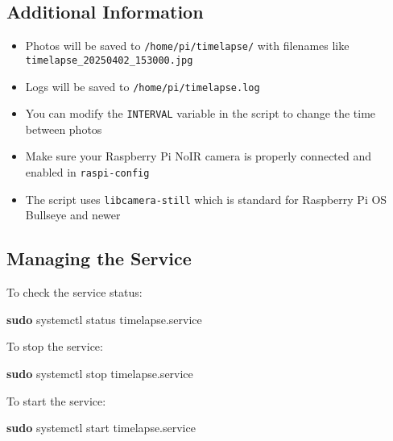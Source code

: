 \documentclass[
]{article}
\newenvironment{Shaded}{\begin{snugshade}}{\end{snugshade}}
\newcommand{\FunctionTok}[1]{\textcolor[rgb]{0.13,0.29,0.53}{\textbf{#1}}}
\newcommand{\NormalTok}[1]{#1}
\providecommand{\tightlist}{%
  \setlength{\itemsep}{0pt}\setlength{\parskip}{0pt}}
\begin{document}
\subsection{Additional Information}\label{additional-information}

\begin{itemize}
\tightlist
\item
  Photos will be saved to \texttt{/home/pi/timelapse/} with filenames
  like \texttt{timelapse\_20250402\_153000.jpg}
\item
  Logs will be saved to \texttt{/home/pi/timelapse.log}
\item
  You can modify the \texttt{INTERVAL} variable in the script to change
  the time between photos
\item
  Make sure your Raspberry Pi NoIR camera is properly connected and
  enabled in \texttt{raspi-config}
\item
  The script uses \texttt{libcamera-still} which is standard for
  Raspberry Pi OS Bullseye and newer
\end{itemize}

\subsection{Managing the Service}\label{managing-the-service}

To check the service status:

\begin{Shaded}
\begin{Highlighting}[]
\FunctionTok{sudo}\NormalTok{ systemctl status timelapse.service}
\end{Highlighting}
\end{Shaded}

To stop the service:

\begin{Shaded}
\begin{Highlighting}[]
\FunctionTok{sudo}\NormalTok{ systemctl stop timelapse.service}
\end{Highlighting}
\end{Shaded}

To start the service:

\begin{Shaded}
\begin{Highlighting}[]
\FunctionTok{sudo}\NormalTok{ systemctl start timelapse.service}
\end{Highlighting}
\end{Shaded}
\end{document}

